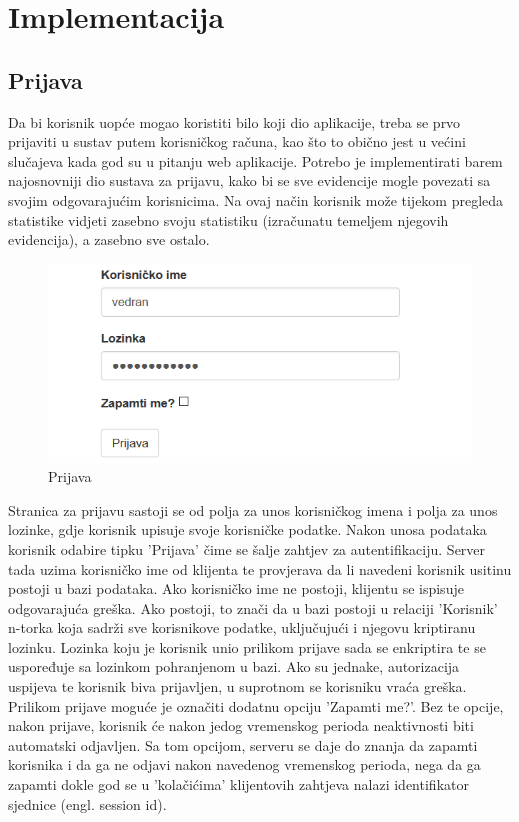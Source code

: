 \documentclass[times, utf8, zavrsni, numeric]{fer}
\begin{document}
\section{Implementacija}
\subsection{Prijava}
Da bi korisnik uopće mogao koristiti bilo koji dio aplikacije, treba se prvo prijaviti u sustav putem korisničkog računa, kao što to obično jest u većini slučajeva kada god su u pitanju web aplikacije. Potrebo je implementirati barem najosnovniji dio sustava za prijavu, kako bi se sve evidencije mogle povezati sa svojim odgovarajućim korisnicima. Na ovaj način korisnik može tijekom pregleda statistike vidjeti zasebno svoju statistiku (izračunatu temeljem njegovih evidencija), a zasebno sve ostalo.

\begin{figure}[H]
\centering
\includegraphics[width=\textwidth,height=\textheight,keepaspectratio]{img/prijava.png}
\caption{Prijava}
\label{fig:prijava}
\end{figure}

Stranica za prijavu sastoji se od polja za unos korisničkog imena i polja za unos lozinke, gdje korisnik upisuje svoje korisničke podatke. Nakon unosa podataka korisnik odabire tipku 'Prijava' čime se šalje zahtjev za autentifikaciju. Server tada uzima korisničko ime od klijenta te provjerava da li navedeni korisnik usitinu postoji u bazi podataka. Ako korisničko ime ne postoji, klijentu se ispisuje odgovarajuća greška. Ako postoji, to znači da u bazi postoji u relaciji 'Korisnik' n-torka koja sadrži sve korisnikove podatke, uključujući i njegovu kriptiranu lozinku. Lozinka koju je korisnik unio prilikom prijave sada se enkriptira te se uspoređuje sa lozinkom pohranjenom u bazi. Ako su jednake, autorizacija uspijeva te korisnik biva prijavljen, u suprotnom se korisniku vraća greška.
Prilikom prijave moguće je označiti dodatnu opciju 'Zapamti me?'. Bez te opcije, nakon prijave, korisnik će nakon jedog vremenskog perioda neaktivnosti biti automatski odjavljen. Sa tom opcijom, serveru se daje do znanja da zapamti korisnika i da ga ne odjavi nakon navedenog vremenskog perioda, nega da ga zapamti dokle god se u 'kolačićima' klijentovih zahtjeva nalazi identifikator sjednice (engl. session id).
\end{document}
